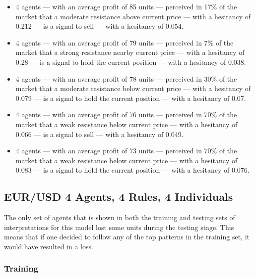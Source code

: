 {\small
  \begin{itemize}
  \item 4 agents — with an average profit of 85 units — perceived in 17\% of the
    market that a moderate resistance above current price — with a hesitancy of
    0.212 — is a signal to sell — with a hesitancy of 0.054.
  \item 4 agents — with an average profit of 79 units — perceived in 7\% of the
    market that a strong resistance nearby current price — with a hesitancy of
    0.28 — is a signal to hold the current position — with a hesitancy of 0.038.
  \item 4 agents — with an average profit of 78 units — perceived in 30\% of the
    market that a moderate resistance below current price — with a hesitancy of
    0.079 — is a signal to hold the current position — with a hesitancy of 0.07.
  \item 4 agents — with an average profit of 76 units — perceived in 70\% of the
    market that a weak resistance below current price — with a hesitancy of
    0.066 — is a signal to sell — with a hesitancy of 0.049.
  \item 4 agents — with an average profit of 73 units — perceived in 70\% of the
    market that a weak resistance below current price — with a hesitancy of
    0.083 — is a signal to hold the current position — with a hesitancy of
    0.076.
  \end{itemize}
}




\subsection{EUR/USD 4 Agents, 4 Rules, 4 Individuals}
\label{}

The only set of agents that is shown in both the training and testing sets of
interpretations for this model lost some units during the testing stage. This
means that if one decided to follow any of the top patterns in the training set,
it would have resulted in a loss.

\subsubsection{Training}
\label{}

